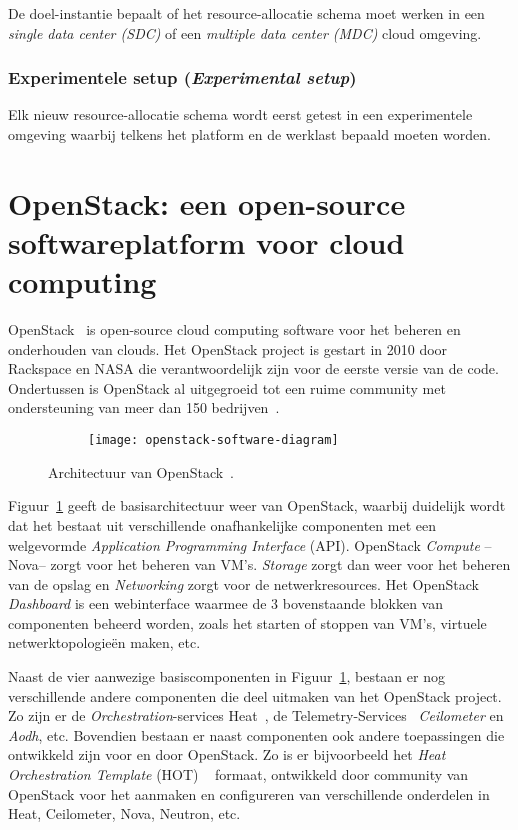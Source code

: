 De doel-instantie bepaalt of het resource-allocatie schema moet werken in een \textit{single data center (SDC)} of een \textit{multiple data center (MDC)} cloud omgeving.

\subsubsection{Experimentele setup (\textit{Experimental setup})}

Elk nieuw resource-allocatie schema wordt eerst getest in een experimentele omgeving waarbij telkens het platform en de werklast bepaald moeten worden.

\section{OpenStack: een open-source softwareplatform voor cloud computing}
\label{sec:Openstack}

OpenStack~\cite{OpenStack2017} is open-source cloud computing software voor het beheren en onderhouden van clouds. Het OpenStack project is gestart in 2010 door Rackspace en NASA die verantwoordelijk zijn voor de eerste versie van de code. Ondertussen is OpenStack al uitgegroeid tot een ruime community met ondersteuning van meer dan 150 bedrijven~\cite{Wuhib2012}.

\begin{figure}
	\centering
	\captionsetup{justification=centering}
	\begin{subfigure}{\textwidth}
		\centering
		\centerline{
			\texttt{[image: openstack-software-diagram]}
		}
	\end{subfigure}
	\caption{Architectuur van OpenStack~\cite{OpenStack2017}.}
	\label{fig:openstackdiagram}
\end{figure}

Figuur~\ref{fig:openstackdiagram} geeft de basisarchitectuur weer van OpenStack, waarbij duidelijk wordt dat het bestaat uit verschillende onafhankelijke componenten met een welgevormde \textit{Application Programming Interface} (API). OpenStack \textit{Compute} --Nova-- zorgt voor het beheren van VM's. \textit{Storage} zorgt dan weer voor het beheren van de opslag en \textit{Networking} zorgt voor de netwerkresources. Het OpenStack \textit{Dashboard} is een webinterface waarmee de 3 bovenstaande blokken van componenten beheerd worden, zoals het starten of stoppen van VM's, virtuele netwerktopologieën maken, etc.

Naast de vier aanwezige basiscomponenten in Figuur~\ref{fig:openstackdiagram}, bestaan er nog verschillende andere componenten die deel uitmaken van het OpenStack project. Zo zijn er de \textit{Orchestration}-services Heat~\cite{OpenStack2017g}, de Telemetry-Services~\cite{OpenStack2017h} \textit{Ceilometer} en \textit{Aodh}, etc. Bovendien bestaan er naast componenten ook andere toepassingen die ontwikkeld zijn voor en door OpenStack. Zo is er bijvoorbeeld het \textit{Heat Orchestration Template} (HOT) ~\cite{OpenStack2017f} formaat, ontwikkeld door community van OpenStack voor het aanmaken en configureren van verschillende onderdelen in Heat, Ceilometer, Nova, Neutron, etc.

